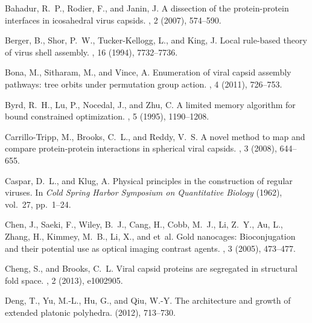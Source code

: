 \documentclass[11pt]{article}
\newcommand{\1}{\mathds{1}}
\begin{document}
\begin{thebibliography}{10}

{\sc Bahadur, R.~P., Rodier, F., and Janin, J.}
\newblock A dissection of the protein-protein interfaces in icosahedral virus
  capsids.
, 2 (2007), 574--590.

{\sc Berger, B., Shor, P.~W., Tucker-Kellogg, L., and King, J.}
\newblock Local rule-based theory of virus shell assembly.
, 16 (1994), 7732--7736.

{\sc Bona, M., Sitharam, M., and Vince, A.}
\newblock Enumeration of viral capsid assembly pathways: tree orbits under
  permutation group action.
, 4 (2011), 726--753.

{\sc Byrd, R.~H., Lu, P., Nocedal, J., and Zhu, C.}
\newblock A limited memory algorithm for bound constrained optimization.
, 5 (1995), 1190--1208.

{\sc Carrillo-Tripp, M., Brooks, C.~L., and Reddy, V.~S.}
\newblock A novel method to map and compare protein-protein interactions in
  spherical viral capsids.
, 3 (2008), 644--655.

{\sc Caspar, D.~L., and Klug, A.}
\newblock Physical principles in the construction of regular viruses.
\newblock In {\em Cold Spring Harbor Symposium on Quantitative Biology\/}
  (1962), vol.~27, pp.~1--24.

{\sc Chen, J., Saeki, F., Wiley, B.~J., Cang, H., Cobb, M.~J., Li, Z.~Y., Au,
  L., Zhang, H., Kimmey, M.~B., Li, X., and et~al.}
\newblock Gold nanocages: Bioconjugation and their potential use as optical
  imaging contrast agents.
, 3 (2005), 473--477.

{\sc Cheng, S., and Brooks, C.~L.}
\newblock Viral capsid proteins are segregated in structural fold space.
, 2 (2013), e1002905.

{\sc Deng, T., Yu, M.-L., Hu, G., and Qiu, W.-Y.}
\newblock The architecture and growth of extended platonic polyhedra.
  (2012), 713--730.


\end{thebibliography}
\end{document}
